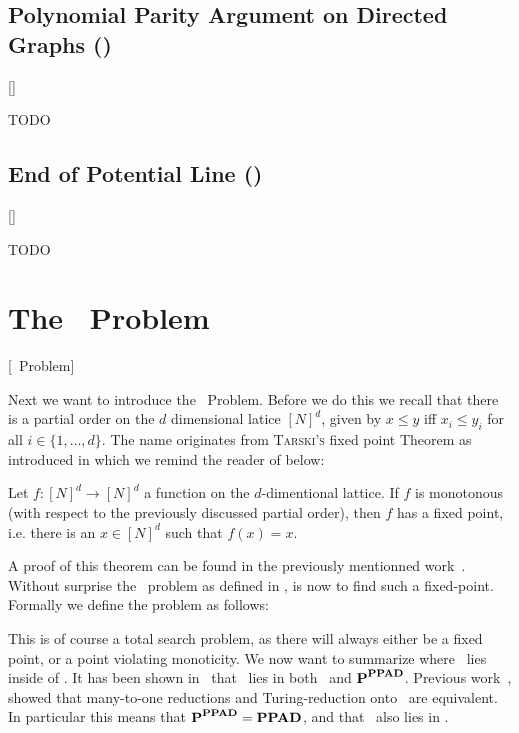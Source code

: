 \subsection{Polynomial Parity Argument on Directed Graphs (\PPAD)}[\PPAD]

TODO

\subsection{End of Potential Line (\EOPL)}[\EOPL]

TODO

\section{The \Tarski\ Problem}[\Tarski\ Problem]

Next we want to introduce the \Tarski\ Problem.
Before we do this we recall that there is a partial order on the $d$ dimensional latice $[N]^d$, given by $x \leq y$ iff $x_i \leq y_i$ for all $i \in \{1,
    \dots, d\}$.
The name originates from \textsc{Tarski's} fixed point Theorem as introduced in  which we remind the reader of below:

\begin{theorem}
    Let $f : [N]^d \rightarrow [N]^d$ a function on the $d$-dimentional lattice.
    If $f$ is monotonous (with respect to the previously discussed partial order), then $f$ has a fixed point, i.e. there is an $x \in [N]^d$ such that
    $f(x)=x$.
\end{theorem}
A proof of this theorem can be found in the previously mentionned work~\cite{tarski_lattice-theoretical_1955}.
Without surprise the \Tarski\ problem as defined in , is now to find such a fixed-point.
Formally we define the problem as follows:

This is of course a total search problem, as there will always either be a fixed point, or a point violating monoticity.
We now want to summarize where \Tarski\ lies inside of \TFNP.
It has been shown in~\cite{etessami_tarskis_2020} that \Tarski\ lies in both \PLS\ and $\textbf{P}^{\textbf{PPAD}}$.
Previous work~, showed that many-to-one reductions and Turing-reduction onto \PPAD\ are equivalent.
In particular this means that $\textbf{P}^{\textbf{PPAD}} = \textbf{PPAD}$, and that \Tarski\ also lies in \PPAD.

